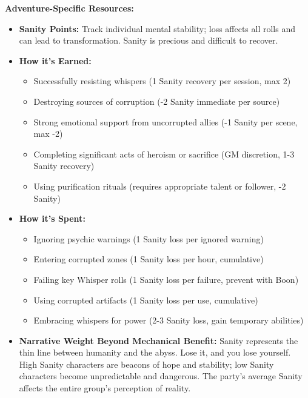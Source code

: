 \documentclass[11pt]{article}
\begin{document}
\textbf{Adventure-Specific Resources:}
\begin{itemize}
\item \textbf{Sanity Points:} Track individual mental stability; loss affects all rolls and can lead to transformation. Sanity is precious and difficult to recover.
\item \textbf{How it's Earned:}
  \begin{itemize}
  \item Successfully resisting whispers (1 Sanity recovery per session, max 2)
  \item Destroying sources of corruption (-2 Sanity immediate per source)
  \item Strong emotional support from uncorrupted allies (-1 Sanity per scene, max -2)
  \item Completing significant acts of heroism or sacrifice (GM discretion, 1-3 Sanity recovery)
  \item Using purification rituals (requires appropriate talent or follower, -2 Sanity)
  \end{itemize}
\item \textbf{How it's Spent:}
  \begin{itemize}
  \item Ignoring psychic warnings (1 Sanity loss per ignored warning)
  \item Entering corrupted zones (1 Sanity loss per hour, cumulative)
  \item Failing key Whisper rolls (1 Sanity loss per failure, prevent with Boon)
  \item Using corrupted artifacts (1 Sanity loss per use, cumulative)
  \item Embracing whispers for power (2-3 Sanity loss, gain temporary abilities)
  \end{itemize}
\item \textbf{Narrative Weight Beyond Mechanical Benefit:} Sanity represents the thin line between humanity and the abyss. Lose it, and you lose yourself. High Sanity characters are beacons of hope and stability; low Sanity characters become unpredictable and dangerous. The party's average Sanity affects the entire group's perception of reality.
\end{itemize}
\end{document}
